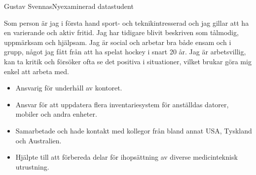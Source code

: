 \documentclass{article}
\begin{document}


\begin{cv}[avatar]{Gustav Svennas}{Nyexaminerad datastudent}


Som person är jag i första hand sport- och teknikintresserad och jag gillar att ha en varierande och aktiv fritid. Jag har tidigare blivit beskriven som tålmodig, uppmärksam och hjälpsam. Jag är social och arbetar bra både ensam och i grupp, något jag fått från att ha spelat hockey i snart 20 år. Jag är arbetsvillig, kan ta kritik och försöker ofta se det positiva i situationer, vilket brukar göra mig enkel att arbeta med.



\begin{cvevent}[juli 2022][aug. 2022]
    \begin{itemize}
        \item Ansvarig för underhåll av kontoret.
    \end{itemize}
\end{cvevent}


\begin{cvevent}[mars 2021][okt. 2021]
    \begin{itemize}
        \item Ansvar för att uppdatera flera inventariesystem för anställdas datorer, mobiler och andra enheter.
        \item Samarbetade och hade kontakt med kollegor från bland annat USA, Tyskland och Australien.
    \end{itemize}
\end{cvevent}


\begin{cvevent}[juni 2015][juli 2015]
    \begin{itemize}
        \item Hjälpte till att förbereda delar för ihopsättning av diverse medicinteknisk utrustning.
    \end{itemize}
\end{cvevent}


\end{cv}
\end{document}

